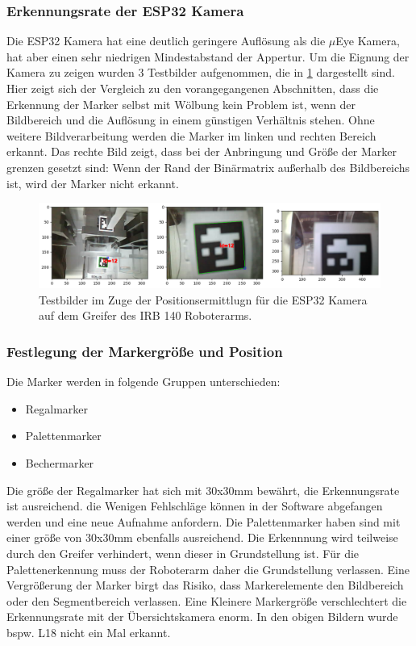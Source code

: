     \subsubsection{Erkennungsrate der ESP32 Kamera}

    Die ESP32 Kamera hat eine deutlich geringere Auflösung als die $\mu$Eye Kamera, hat aber einen sehr niedrigen Mindestabstand der Appertur.
    Um die Eignung der Kamera zu zeigen wurden 3 Testbilder aufgenommen, die in \ref{fig:figure27} dargestellt sind.
    Hier zeigt sich der Vergleich zu den vorangegangenen Abschnitten, dass die Erkennung der Marker selbst mit Wölbung kein Problem ist, wenn der Bildbereich und die Auflösung in einem günstigen Verhältnis stehen.
    Ohne weitere Bildverarbeitung werden die Marker im linken und rechten Bereich erkannt. 
    Das rechte Bild zeigt, dass bei der Anbringung und Größe der Marker grenzen gesetzt sind: Wenn der Rand der Binärmatrix außerhalb des Bildbereichs ist, wird der Marker nicht erkannt.

    \begin{figure}
        \caption[Testbilder mit ESP 32 WebCam]{Testbilder im Zuge der Positionsermittlugn für die ESP32 Kamera auf dem Greifer des IRB 140 Roboterarms.}\label{fig:figure27}
        \includegraphics[width = \textwidth]{Bilder/ESP32CamTest.png}
        \centering
    \end{figure}

    \subsubsection{Festlegung der Markergröße und Position}

    Die Marker werden in folgende Gruppen unterschieden:
    \begin{itemize}
        \item Regalmarker
        \item Palettenmarker
        \item Bechermarker
    \end{itemize}
    Die größe der Regalmarker hat sich mit 30x30mm bewährt, die Erkennungsrate ist ausreichend. die Wenigen Fehlschläge können in der Software abgefangen werden und eine neue Aufnahme anfordern.
    Die Palettenmarker haben sind mit einer größe von 30x30mm ebenfalls ausreichend. Die Erkennnung wird teilweise durch den Greifer verhindert, wenn dieser in Grundstellung ist. 
    Für die Palettenerkennung muss der Roboterarm daher die Grundstellung verlassen. Eine Vergrößerung der Marker birgt das Risiko, dass Markerelemente den Bildbereich oder den Segmentbereich verlassen. 
    Eine Kleinere Markergröße verschlechtert die Erkennungsrate mit der Übersichtskamera enorm. In den obigen Bildern wurde bspw. L18 nicht ein Mal erkannt.
    
